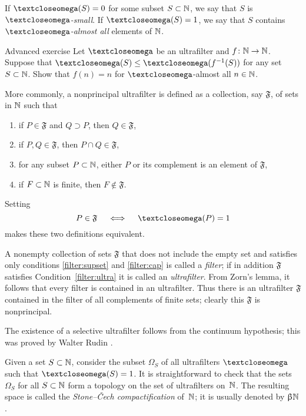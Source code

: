 If $\o(S)=0$ for some subset $S\subset \NN$,
we say that $S$ is \emph{$\o$-small}. 
If $\o(S)=1$, we say that $S$ contains \emph{$\o$-almost all} elements of $\mathbb{N}$.

\begin{thm}{Advanced exercise}\label{ex:ultrakatetov}
Let $\o$ be an ultrafilter and $f\:\NN\z\to \NN$.
Suppose that $\o(S)\le \o(f^{-1}(S))$ for any set $S\subset \NN$.
Show that $f(n)=n$ for $\o$-almost all $n\in\NN$.
\end{thm}

More commonly, a nonprincipal ultrafilter is defined as a collection, say $\mathfrak{F}$, of sets in $\mathbb{N}$ such that
\begin{enumerate}
\item\label{filter:supset} if $P\in \mathfrak{F}$ and $Q\supset P$, then $Q\in \mathfrak{F}$,
\item\label{filter:cap} if $P, Q\in \mathfrak{F}$, then $P\cap Q\in \mathfrak{F}$,
\item\label{filter:ultra} for any subset $P\subset\NN$, either $P$ or its complement is an element of $\mathfrak{F}$,
\item\label{filter:non-prin} if $F\subset \NN $ is finite, then $F\notin \mathfrak{F}$.
\end{enumerate}

Setting 
\[P\in\mathfrak{F}\quad\iff\quad\o(P)=1\] 
makes these two definitions equivalent.

A nonempty collection of sets $\mathfrak{F}$ that does not include the empty set and satisfies only conditions \ref{filter:supset} and \ref{filter:cap} is called a \emph{filter}; 
if in addition $\mathfrak{F}$ satisfies Condition~\ref{filter:ultra} it is called an \emph{ultrafilter}.
From Zorn's lemma, it follows that every filter is contained in an ultrafilter.
Thus there is an ultrafilter $\mathfrak{F}$ contained in the filter of all complements of finite sets; clearly this $\mathfrak{F}$ is nonprincipal.

The existence of a selective ultrafilter follows from the continuum hypothesis;
this was proved by Walter Rudin \cite{rudin}.

Given a set $S\subset \NN$, consider the subset $\Omega_S$ of all ultrafilters $\o$ such that $\o(S)=1$.
It is straightforward to check that the sets $\Omega_S$ for all $S\subset \NN$ form a topology on the set of ultrafilters on~$\mathbb{N}$. 
The resulting space is called the \emph{Stone--\v{C}ech compactification} of~$\mathbb{N}$; it is usually denoted by $\beta\NN$\index{ $\beta\NN$} .

